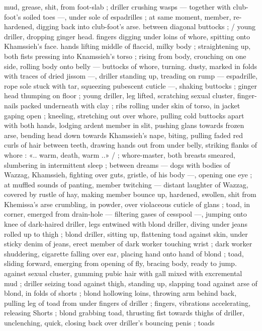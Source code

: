 mud, grease, shit, from foot-slab ; driller crushing wasps --- together
with club-foot's soiled toes ---, under sole of espadrilles ; at same
moment, member, re-hardened, digging back into club-foot's arse.
between diagonal buttocks ; / young driller, dropping ginger head.
fingers digging under loins of whore, spitting onto Khamssieh’s face.
hands lifting middle of flaccid, milky body ; straightening up, both
fists pressing into Knamssieh’s torso ; rising from body, crouching on
one side, rolling body onto belly --- buttocks of whore, turning.
dusty, marked in folds with traces of dried jissom ---, driller standing
up, treading on rump --- espadrille, rope sole stuck with tar,
squeezing pubescent cuticle ---, shaking buttocks ; ginger head
thumping on floor ; young driller, leg lifted, scratching sexual cluster,
finger-nails packed underneath with clay ; ribs rolling under skin of
torso, in jacket gaping open ; kneeling, stretching out over whore,
pulling cold buttocks apart with both hands, lodging ardent member
in slit, pushing glans towards frozen arse, bending head down
towards Khamssieh's nape, biting, pulling faded red curls of hair
between teeth, drawing hands out from under belly, striking flanks of
whore : «.. warm, death, warm ..» / ; whore-master, both breasts
smeared, slumbering in intermittent sleep ; between dreams --- dogs
with bodies of Wazzag, Khamssieh, fighting over guts, gristle, of his
body ---, opening one eye ; at muffled sounds of panting, member
twitching --- distant laughter of Wazzag, covered by rustle of hay,
making member bounce up, hardened, swollen, shit from Khemissa's
arse crumbling, in powder, over violaceous cuticle of glans ; toad, in
corner, emerged from drain-hole --- filtering gases of cesspool ---,
jumping onto knee of dark-haired driller, legs entwined with blond
driller, diving under jeans rolled up to thigh ; blond driller, sitting up,
flattening toad against skin, under sticky denim of jeans, erect
member of dark worker touching wrist ; dark worker shuddering,
cigarette falling over ear, placing hand onto hand of blond ; toad,
sliding forward, emerging from opening of fly, bracing body, ready to
jump. against sexual cluster, gumming pubic hair with gall mixed with
excremental mud ; driller seizing toad against thigh, standing up,
slapping toad against arse of blond, in folds of shorts ; blond
hollowing loins, throwing arm behind back, pulling leg of toad from
under fingers of driller ; fingers, vibrations accelerating, releasing
Shorts ; blond grabbing toad, thrusting fist towards thighs of driller,
unclenching, quick, closing back over driller's bouncing penis ; toads
